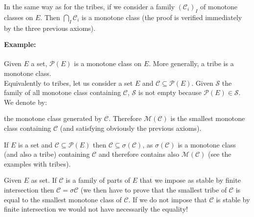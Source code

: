 	In the same way as for the tribes, if we consider a family $(\mathcal{C}_i)_I$ of monotone classes on $E$. Then $\bigcap_I \mathcal{C}_i$ is a monotone class (the proof is verified immediately by the three previous axioms).
	\begin{tcolorbox}[colframe=black,colback=white,sharp corners]
	\textbf{{\Large {}}Example:}\\\\
	Given $E$ a set, $\mathcal{P}(E)$ is a monotone class on $E$. More generally, a tribe is a monotone class.\\

	Equivalently to tribes, let us consider a set $E$ and $\mathcal{C}\subseteq \mathcal{P}(E)$. Given $\mathcal{S}$ the family of all monotone class containing $\mathcal{C}$, $\mathcal{S}$ is not empty because $\mathcal{P}(E)\in \mathcal{S}$. We denote by:
	
	the monotone class generated by $\mathcal{C}$. Therefore $\mathcal{M}(\mathcal{C})$ is the smallest monotone class containing $\mathcal{C}$ (and satisfying obviously the previous axioms).
	\end{tcolorbox}
	\begin{tcolorbox}[title=Remark,arc=10pt,breakable,drop lifted shadow,
  skin=enhanced,
  skin first is subskin of={enhancedfirst}{arc=10pt,no shadow},
  skin middle is subskin of={enhancedmiddle}{arc=10pt,no shadow},
  skin last is subskin of={enhancedlast}{drop lifted shadow}]
	If $E$ is a set and $\mathcal{C}\subseteq \mathcal{P}(E)$ then $\mathcal{C}\subseteq \sigma(\mathcal{C})$, as $\sigma(\mathcal{C})$ is a monotone class (and also a tribe) containing $\mathcal{C}$ and therefore contains also $\mathcal{M}(\mathcal{C})$ (see the examples with tribes).
	\end{tcolorbox}	
	 \begin{theorem}
	Given $E$ as set. If $\mathcal{C}$ is a family of parts of $E$ that we impose as stable by finite intersection then $\mathcal{C}=\sigma{\mathcal{C}}$ (we then have to prove that the smallest tribe of $\mathcal{C}$ is equal to the smallest monotone class of $\mathcal{C}$. If we do not impose that $\mathcal{C}$ is stable by finite intersection we would not have necessarily the equality!
	\end{theorem}
